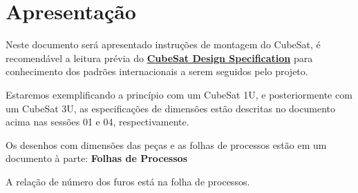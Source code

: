 \section{Apresentação}

Neste documento será apresentado instruções de montagem do CubeSat, é recomendável a leitura prévia do  \textbf{\href{http://www.cubesat.org/images/developers/cds_rev13_final.pdf}{CubeSat Design Specification}} para conhecimento dos padrões internacionais a serem seguidos pelo projeto.

Estaremos exemplificando a princípio com um CubeSat 1U, e posteriormente com um CubeSat 3U, as especificações de dimensões estão descritas no documento acima nas sessões 01 e 04, respectivamente.


Os desenhos com dimensões das peças e as folhas de processos estão em um documento à parte: \textbf{Folhas de Processos}

A relação de número dos furos está na folha de processos.

